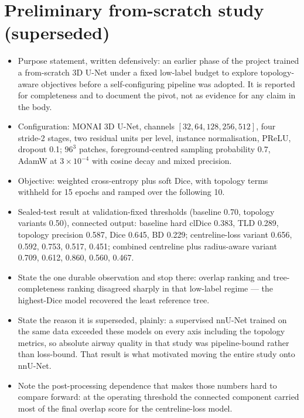 \section{Preliminary from-scratch study (superseded)}


\begin{itemize}
  \item Purpose statement, written defensively: an earlier phase of the project trained a
  from-scratch 3D U-Net under a fixed low-label budget to explore topology-aware objectives
  before a self-configuring pipeline was adopted. It is reported for completeness and to
  document the pivot, not as evidence for any claim in the body.
  \item Configuration: MONAI 3D U-Net, channels $[32,64,128,256,512]$, four stride-2 stages,
  two residual units per level, instance normalisation, PReLU, dropout 0.1; $96^3$ patches,
  foreground-centred sampling probability 0.7, AdamW at $3\times10^{-4}$ with cosine decay and
  mixed precision.
  \item Objective: weighted cross-entropy plus soft Dice, with topology terms withheld for 15
  epochs and ramped over the following 10.
  \item Sealed-test result at validation-fixed thresholds (baseline 0.70, topology variants
  0.50), connected output: baseline hard clDice 0.383, TLD 0.289, topology precision 0.587,
  Dice 0.645, BD 0.229; centreline-loss variant 0.656, 0.592, 0.753, 0.517, 0.451; combined
  centreline plus radius-aware variant 0.709, 0.612, 0.860, 0.560, 0.467.
  \item State the one durable observation and stop there: overlap ranking and tree-completeness
  ranking disagreed sharply in that low-label regime --- the highest-Dice model recovered the
  least reference tree.
  \item State the reason it is superseded, plainly: a supervised nnU-Net trained on the same
  data exceeded these models on every axis including the topology metrics, so absolute airway
  quality in that study was pipeline-bound rather than loss-bound. That result is what
  motivated moving the entire study onto nnU-Net.
  \item Note the post-processing dependence that makes those numbers hard to compare forward:
  at the operating threshold the connected component carried most of the final overlap score
  for the centreline-loss model.
\end{itemize}


